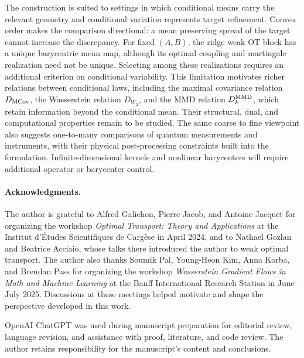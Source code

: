\documentclass[11pt]{article}
\theoremstyle{plain}
\theoremstyle{definition}
\theoremstyle{remark}
\begin{document}
The construction is suited to settings in which conditional means carry the relevant
geometry and conditional variation represents target refinement. Convex order makes
the comparison directional: a mean preserving spread of the target cannot increase
the discrepancy. For fixed $(A,B)$, the ridge weak OT block has a unique barycentric
mean map, although its optimal coupling and martingale realization need not be unique.
Selecting among these realizations requires an additional criterion on conditional
variability. This limitation motivates richer relations between conditional laws,
including the maximal covariance relation \(D_{\rm MCov}\), the Wasserstein relation
\(D_{W_2}\), and the MMD relation \(D_k^{\rm MMD}\), which retain information beyond
the conditional mean. Their structural, dual, and computational properties remain to
be studied. The same coarse to fine viewpoint also suggests one-to-many comparisons
of quantum measurements and instruments, with their physical post-processing
constraints built into the formulation. Infinite-dimensional kernels and nonlinear
barycenters will require additional operator or barycenter control.

\paragraph{Acknowledgments.}
The author is grateful to Alfred Galichon, Pierre Jacob, and Antoine Jacquet for
organizing the workshop \emph{Optimal Transport: Theory and Applications} at the
Institut d'\'Etudes Scientifiques de Carg\`ese in April 2024, and to Nathael Gozlan
and Beatrice Acciaio, whose talks there introduced the author to weak optimal
transport. The author also thanks Soumik Pal, Young-Heon Kim, Anna Korba, and
Brendan Pass for organizing the workshop \emph{Wasserstein Gradient Flows in Math
and Machine Learning} at the Banff International Research Station in June--July
2025. Discussions at these meetings helped motivate and shape the perspective
developed in this work.

OpenAI ChatGPT was used during manuscript preparation for editorial review, language
revision, and assistance with proof, literature, and code review. The author retains
responsibility for the manuscript's content and conclusions.

\iffalse %
\end{document}
